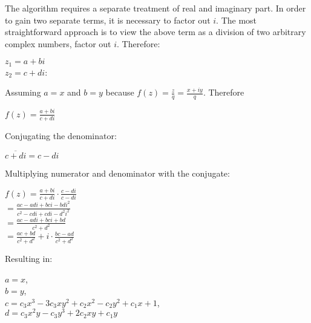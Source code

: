 \documentclass[]{article}
\begin{document}
\noindent The algorithm requires a separate treatment of real and imaginary part. In order to gain two separate terms, it is necessary to factor out $i$. The most straightforward approach is to view the above term as a division of two arbitrary complex numbers, factor out $i$. Therefore:

\begin{flushleft}
	\hspace{20pt} $z_1 = a + bi$ \\
	\medskip
	\hspace{20pt} $z_2 = c + di$:
\end{flushleft}

\noindent Assuming $a = x$ and $b = y$ because $f(z) = \frac{z}{q} = \frac{x + iy}{q}$. Therefore

\begin{flushleft}
	\hspace{20pt} $f(z) = \frac{a + bi}{c + di}$ \\
\end{flushleft}

\noindent Conjugating the denominator:

\begin{flushleft}
	\hspace{20pt} $\overline{c+di} = c - di $ \\
\end{flushleft}

\noindent Multiplying numerator and denominator with the conjugate:

\begin{flushleft}
	\hspace{20pt} $f(z) = \frac{a + bi}{c + di} \cdot \frac{c - di}{c - di} $ \\
	\medskip
	\hspace{20pt}\hspace{2.5em}$= \frac{ac - adi + bci - bdi^2}{c^2 - cdi + cdi - d^2i^2}$ \\
	\medskip
	\hspace{20pt}\hspace{2.5em}$= \frac{ac - adi + bci + bd}{c^2 + d^2}$ \\
	\medskip
	\hspace{20pt}\hspace{2.5em}$= \frac{ac + bd}{c^2 + d^2} + i \cdot \frac{bc - ad}{c^2 + d^2}$
\end{flushleft}

\noindent Resulting in:

\begin{flushleft}
	\hspace{20pt} $a = x$, \\
	\hspace{20pt} $b = y$, \\
	\hspace{20pt} $c = c_3x^3 - 3c_3xy^2 + c_2x^2 - c_2y^2 + c_1x + 1$, \\
	\hspace{20pt} $d = c_3x^2y - c_3y^3 + 2c_2xy + c_1y$ \\
\end{flushleft}
\end{document}
